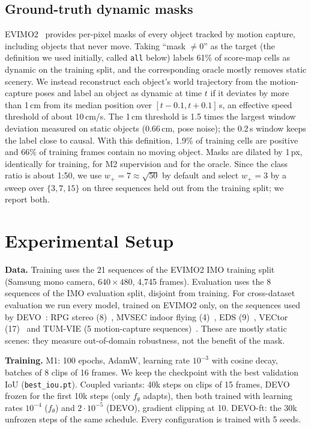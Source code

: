 \documentclass[conference]{IEEEtran}
\newcommand{\code}[1]{\texttt{#1}}
\newcommand{\wplus}{w_{+}}
\begin{document}
\subsection{Ground-truth dynamic masks}

EVIMO2~\cite{burner2022evimo2} provides per-pixel masks of every object tracked by motion
capture, including objects that never move. Taking ``mask $\neq 0$'' as the target (the
definition we used initially, called \code{all} below) labels 61\% of score-map cells as
dynamic on the training split, and the corresponding oracle mostly removes static
scenery. We instead reconstruct each object's world trajectory from the motion-capture
poses and label an object as dynamic at time $t$ if it deviates by more than 1\,cm from
its median position over $[t - 0.1, t + 0.1]$\,s, an effective speed threshold of about
10\,cm/s. The 1\,cm threshold is 1.5 times the largest window deviation measured on static
objects (0.66\,cm, pose noise); the 0.2\,s window keeps the label close to causal. With
this definition, 1.9\% of training cells are positive and 66\% of training frames contain
no moving object. Masks are dilated by 1\,px, identically for training, for M2 supervision
and for the oracle. Since the class ratio is about 1:50, we use
$\wplus = 7 \approx \sqrt{50}$ by default and select $\wplus = 3$ by a sweep over
$\{3, 7, 15\}$ on three sequences held out from the training split; we report both.

\section{Experimental Setup}

\textbf{Data.} Training uses the 21 sequences of the EVIMO2 IMO training split (Samsung
mono camera, $640 \times 480$, 4,745 frames). Evaluation uses the 8 sequences of the IMO
evaluation split, disjoint from training. For cross-dataset evaluation we run every model,
trained on EVIMO2 only, on the sequences used by DEVO~\cite{klenk2024devo}: RPG stereo
(8)~\cite{zhou2018semidense}, MVSEC indoor flying (4)~\cite{zhu2018mvsec},
EDS (9)~\cite{hidalgo2022eds}, VECtor (17)~\cite{gao2022vector} and TUM-VIE (5
motion-capture sequences)~\cite{klenk2021tumvie}. These are mostly static scenes: they
measure out-of-domain robustness, not the benefit of the mask.

\textbf{Training.} M1: 100 epochs, AdamW, learning rate $10^{-3}$ with cosine decay,
batches of 8 clips of 16 frames. We keep the checkpoint with the best validation IoU
(\code{best\_iou.pt}). Coupled variants: 40k steps on clips of 15 frames, DEVO frozen for
the first 10k steps (only $f_\theta$ adapts), then both trained with learning rates
$10^{-4}$ ($f_\theta$) and $2 \cdot 10^{-5}$ (DEVO), gradient clipping at 10. DEVO-ft: the
30k unfrozen steps of the same schedule. Every configuration is trained with 5 seeds.
\end{document}
